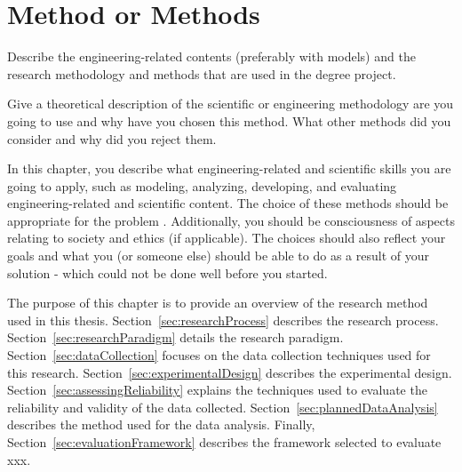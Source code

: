 \documentclass[english]{kththesis}
\begin{document}
\cleardoublepage
\chapter{Method or Methods}
\label{ch:methods}


Describe the engineering-related contents (preferably with models) and the research methodology and methods that are used in the degree project. 

Give a theoretical description of the scientific or engineering methodology are you going to use and why have you chosen this method. What other methods did you consider and why did you reject them.

In this chapter, you describe what engineering-related and scientific skills you are going to apply, such as modeling, analyzing, developing, and evaluating engineering-related and scientific content. The choice of these methods should be appropriate for the problem . Additionally, you should be consciousness of aspects relating to society and ethics (if applicable). The choices should also reflect your goals and what you (or someone else) should be able to do as a result of your solution - which could not be done well before you started.

The purpose of this chapter is to provide an overview of the research method
used in this thesis. Section~\ref{sec:researchProcess} describes the research
process. Section~\ref{sec:researchParadigm} details the research
paradigm. Section~\ref{sec:dataCollection} focuses on the data collection
techniques used for this research. Section~\ref{sec:experimentalDesign}
describes the experimental design. Section~\ref{sec:assessingReliability}
explains the techniques used to evaluate the reliability and validity of the
data collected. Section~\ref{sec:plannedDataAnalysis} describes the method
used for the data analysis. Finally, Section~\ref{sec:evaluationFramework}
describes the framework selected to evaluate xxx.
\end{document}
